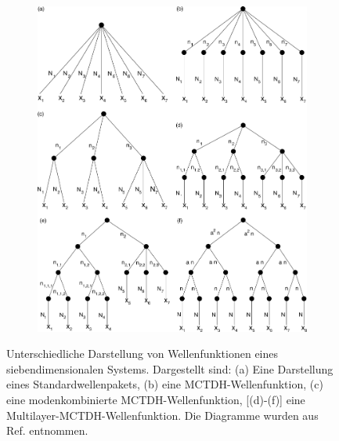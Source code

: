 \begin{figure}
    \centering
    \captionsetup[subfigure]{position=top, labelfont=bf,textfont=normalfont,singlelinecheck=off,justification=raggedright,labelformat=empty}
    \begin{subfigure}{\textwidth}
        \caption{}\label{fig:a}
    \end{subfigure}
    \begin{subfigure}{\textwidth}
        \caption{}\label{fig:b}
    \end{subfigure}
    \begin{subfigure}{\textwidth}
        \caption{}\label{fig:c}
    \end{subfigure}
    \begin{subfigure}{\textwidth}
        \caption{}\label{fig:d}
    \end{subfigure}
    \begin{subfigure}{\textwidth}
        \caption{}\label{fig:e}
    \end{subfigure}
    \begin{subfigure}{\textwidth}
        \caption{}\label{fig:f}
        \vspace*{-4cm}\includegraphics[width=\textwidth]{figures/treeDiagramms}
    \end{subfigure}
    \caption{Unterschiedliche Darstellung von Wellenfunktionen eines siebendimensionalen Systems. Dargestellt sind: (a) Eine Darstellung eines Standardwellenpakets,
      (b) eine MCTDH-Wellenfunktion, (c) eine modenkombinierte MCTDH-Wellenfunktion, [(d)-(f)] eine Multilayer-MCTDH-Wellenfunktion. Die Diagramme wurden aus Ref.\cite{Mreview2} 
      entnommen.} \label{fig:tree}
\end{figure}


